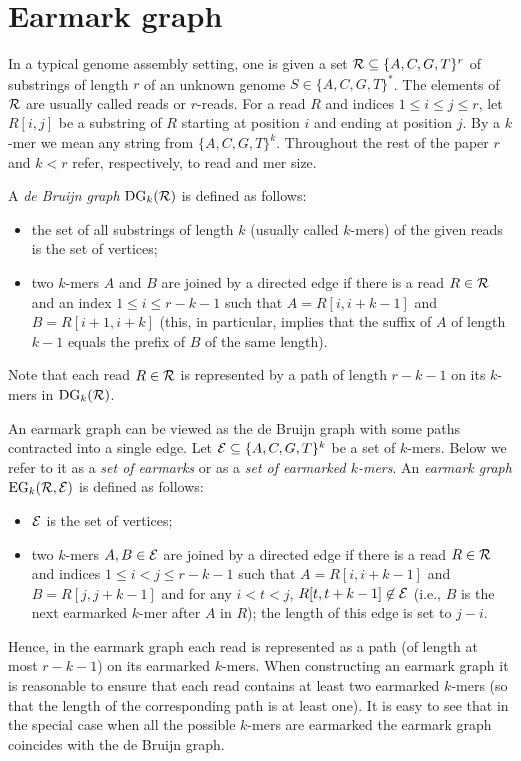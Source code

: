\documentclass[12pt]{article}
\begin{document}
\section{Earmark graph}
In a typical genome assembly setting, one is given a set 
${\cal R} \subseteq \{A,C,G,T\}^r$ 
of substrings of length $r$ of an unknown genome $S \in \{A,C,G,T\}^*$.
The elements of ${\cal R}$ are usually called reads or $r$-reads.
For a read $R$ and indices $1 \le i \le j \le r$,
let $R[i,j]$ be a substring of $R$ starting at position $i$
and ending at position $j$. By a $k$-mer we mean any string from
$\{A,C,G,T\}^k$. Throughout the rest of the paper $r$ and $k<r$
refer, respectively, to read and mer size.

A \emph{de Bruijn graph} $\textrm{DG}_k({\cal R})$ is defined as follows:
\begin{itemize}
\item the set of all substrings of length $k$ (usually called $k$-mers) of the given reads is the 
set of vertices; 
\item two $k$-mers $A$ and $B$ are joined by a directed edge if there is a
read $R \in {\cal R}$ and an index $1 \le i \le r-k-1$ such that
$A=R[i,i+k-1]$ and $B=R[i+1,i+k]$
(this, in particular, implies that
the suffix of $A$ of length $k-1$ equals the prefix of $B$ of the same length).
\end{itemize}
Note that each read $R \in {\cal R}$ is represented by a path of length $r-k-1$
on its $k$-mers in $\textrm{DG}_k({\cal R})$.


An earmark graph can be viewed as the de Bruijn graph
with some paths contracted into a single edge.
Let ${\cal E} \subseteq \{A,C,G,T\}^k$ be a set of $k$-mers.
Below we refer to it as a \emph{set of earmarks} or as a \emph{set of earmarked $k$-mers}. 
An \emph{earmark graph} $\textrm{EG}_k({\cal R}, {\cal E})$ is defined as follows:
\begin{itemize}
\item ${\cal E}$ is the set of vertices;
\item two $k$-mers $A, B \in {\cal E}$ are joined by a directed edge if there is a read $R \in {\cal R}$
and indices $1 \le i < j \le r-k-1$ such that
$A=R[i,i+k-1]$ and $B=R[j,j+k-1]$ and 
for any $i < t < j$, $R[t,t+k-1] \not \in {\cal E}$
(i.e., $B$ is the next earmarked $k$-mer after $A$ in $R$); the length of this edge is set to
$j-i$.
\end{itemize}
Hence, in the earmark graph each read is represented as a path (of length at most $r-k-1$) on its earmarked $k$-mers.
When constructing an earmark graph it is reasonable to ensure that each read contains at least two 
earmarked $k$-mers (so that the length of the corresponding path is at least one).
It is easy to see that in the special case when all the possible $k$-mers are earmarked
the earmark graph coincides with the de Bruijn graph.
\end{document}
